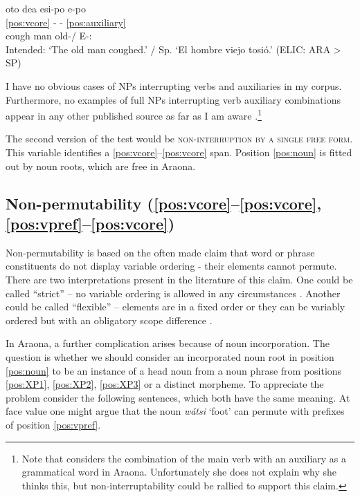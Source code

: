 \documentclass[output=paper,hidelinks]{langscibook}
\begin{document}
\ea \label{ex:otoepo}
    \glll   *oto dea esi-po e-po \\
    \ref{pos:vcore} - - \ref{pos:auxiliary} \\
     cough man old-\Rel{}/\Nmlz{} E-\Aux{}:\Intr{}  \\
    \glt Intended: `The old man coughed.' / Sp. `El hombre viejo tosió.'  \hfill (ELIC: ARA > SP)
\z 


I have no obvious cases of NPs interrupting verbs and auxiliaries in my corpus. Furthermore, no examples of full NPs interrupting verb auxiliary combinations appear in any other published source as far as I am aware \citep{pitman:1980:araonasketch, emkow:2019:araonarepublish}.\footnote{Note that \citet[88]{emkow:2019:araonarepublish} considers the combination of the main verb with an auxiliary as a grammatical word in Araona. Unfortunately she does not explain why she thinks this, but non-interruptability could be rallied to support this claim.}

The second version of the test would be \textsc{non-interruption by a single free form}. This variable identifies a \ref{pos:vcore}--\ref{pos:vcore} span. Position \ref{pos:noun} is fitted out by noun roots, which are free in Araona.


\subsection{Non-permutability (\ref{pos:vcore}--\ref{pos:vcore}, \ref{pos:vpref}--\ref{pos:vcore})}
\label{araona:sec:non-permutability}

Non-permutability is based on the often made claim that word or phrase constituents do not display variable ordering - their elements cannot permute. There are two interpretations present in the literature of this claim. One could be called ``strict''  -- no variable ordering is allowed in any circumstances \citep{dixonaikhenvald:2002}. Another could be called ``flexible'' -- elements are in a fixed order or they can be variably ordered but with an obligatory scope difference \citep{Anderson2005}.

In Araona, a further complication arises because of noun incorporation. The question is whether we should consider an incorporated noun root in position \ref{pos:noun} to be an instance of a head noun from a noun phrase from positions \ref{pos:XP1}, \ref{pos:XP2}, \ref{pos:XP3} or a distinct morpheme. To appreciate the problem consider the following sentences, which both have the same meaning. At face value one might argue that the noun \textit{wátsi} `foot' can permute with prefixes of position \ref{pos:vpref}.
\end{document}
